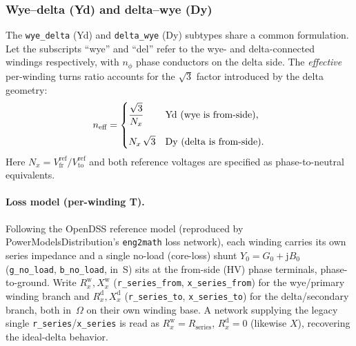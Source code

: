 \documentclass[11pt,a4paper]{article}
\begin{document}
\subsubsection*{Wye--delta (Yd) and delta--wye (Dy)}

The \texttt{wye\_delta} (Yd) and \texttt{delta\_wye} (Dy) subtypes share a
common formulation.  Let the subscripts ``wye'' and ``del'' refer to the wye-
and delta-connected windings respectively, with $n_\phi$ phase conductors on the
delta side.  The \emph{effective} per-winding turns ratio accounts for the
$\sqrt{3}$ factor introduced by the delta geometry:
%
\begin{equation}
  n_\text{eff} =
  \begin{dcases}
    \dfrac{\sqrt{3}}{N_x} & \text{Yd (wye is from-side)},\\[6pt]
    N_x\,\sqrt{3}         & \text{Dy (delta is from-side)}.
  \end{dcases}
\end{equation}
%
Here $N_x = V^\text{ref}_\text{fr} / V^\text{ref}_\text{to}$ and both reference
voltages are specified as phase-to-neutral equivalents.

\paragraph{Loss model (per-winding T).}
Following the OpenDSS reference model (reproduced by PowerModelsDistribution's
\texttt{eng2math} loss network), each winding carries its own series impedance
and a single no-load (core-loss) shunt $Y_0 = G_0 + \mathrm{j}B_0$
(\texttt{g\_no\_load}, \texttt{b\_no\_load}, in~S) sits at the from-side (HV)
phase terminals, phase-to-ground.  Write $R^\text{w}_x, X^\text{w}_x$
(\texttt{r\_series\_from}, \texttt{x\_series\_from}) for the wye/primary winding
branch and $R^\text{d}_x, X^\text{d}_x$
(\texttt{r\_series\_to}, \texttt{x\_series\_to}) for the delta/secondary branch,
both in~$\Omega$ on their own winding base.  A network supplying the legacy
single \texttt{r\_series}/\texttt{x\_series} is read as
$R^\text{w}_x = R_\text{series}$, $R^\text{d}_x = 0$ (likewise $X$),
recovering the ideal-delta behavior.
\end{document}
